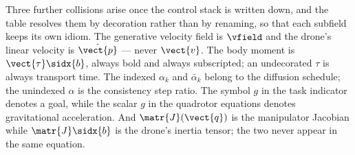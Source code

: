 Three further collisions arise once the control stack is written down, and the table resolves them
by decoration rather than by renaming, so that each subfield keeps its own idiom. The generative
velocity field is $\vfield$ and the drone's linear velocity is $\dot{\vect{p}}$ --- never $\vect{v}$.
The body moment is $\vect{\tau}\sidx{b}$, always bold and always subscripted; an undecorated $\tau$
is always transport time. The indexed $\alpha_k$ and $\bar{\alpha}_k$ belong to the diffusion
schedule; the unindexed $\alpha$ is the consistency step ratio. The symbol $g$ in the task indicator
denotes a goal, while the scalar $g$ in the quadrotor equations denotes gravitational acceleration.
And $\matr{J}(\vect{q})$ is the manipulator Jacobian while
$\matr{J}\sidx{b}$ is the drone's inertia tensor; the two never appear in the same equation.

